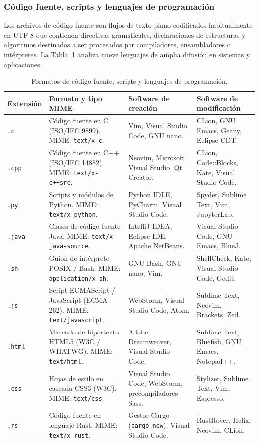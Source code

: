 \documentclass[12pt]{article}
\begin{document}
\subsubsection{Código fuente, scripts y lenguajes de programación}
Los archivos de código fuente son flujos de texto plano codificados habitualmente en UTF-8 que contienen directivas gramaticales, declaraciones de estructuras y algoritmos destinados a ser procesados por compiladores, ensambladores o intérpretes. La Tabla~\ref{tab:formatosCodigo} analiza nueve lenguajes de amplia difusión en sistemas y aplicaciones.

\begin{table}[H]
\centering
\scriptsize
\renewcommand{\arraystretch}{0.95}
\renewcommand{\tabularxcolumn}[1]{m{#1}}
\setlength{\emergencystretch}{2em}
\caption{Formatos de código fuente, scripts y lenguajes de programación.}
\label{tab:formatosCodigo}
\begin{tabularx}{\textwidth}{>{\centering\arraybackslash}m{1.8cm} X X X}
\toprule
\textbf{Extensión} & \textbf{Formato y tipo MIME} & \textbf{Software de creación} & \textbf{Software de modificación} \\
\midrule
\texttt{.c} & Código fuente en C (ISO/IEC 9899). MIME: \texttt{text/x-c}. & Vim, Visual Studio Code, GNU nano. & CLion, GNU Emacs, Geany, Eclipse CDT. \\
\texttt{.cpp} & Código fuente en C++ (ISO/IEC 14882). MIME: \texttt{text/x-c++src}. & Neovim, Microsoft Visual Studio, Qt Creator. & CLion, Code::Blocks, Kate, Visual Studio Code. \\
\texttt{.py} & Scripts y módulos de Python. MIME: \texttt{text/x-python}. & Python IDLE, PyCharm, Visual Studio Code. & Spyder, Sublime Text, Vim, JupyterLab. \\
\texttt{.java} & Clases de código fuente Java. MIME: \texttt{text/x-java-source}. & IntelliJ IDEA, Eclipse IDE, Apache NetBeans. & Visual Studio Code, GNU Emacs, BlueJ. \\
\texttt{.sh} & Guion de intérprete POSIX / Bash. MIME: \texttt{application/x-sh}. & GNU Bash, GNU nano, Vim. & ShellCheck, Kate, Visual Studio Code, Gedit. \\
\texttt{.js} & Script ECMAScript / JavaScript (ECMA-262). MIME: \texttt{text/javascript}. & WebStorm, Visual Studio Code, Atom. & Sublime Text, Neovim, Brackets, Zed. \\
\texttt{.html} & Marcado de hipertexto HTML5 (W3C / WHATWG). MIME: \texttt{text/html}. & Adobe Dreamweaver, Visual Studio Code. & Sublime Text, Bluefish, GNU Emacs, Notepad++. \\
\texttt{.css} & Hojas de estilo en cascada CSS3 (W3C). MIME: \texttt{text/css}. & Visual Studio Code, WebStorm, precompiladores Sass. & Stylizer, Sublime Text, Vim, Espresso. \\
\texttt{.rs} & Código fuente en lenguaje Rust. MIME: \texttt{text/x-rust}. & Gestor Cargo (\texttt{cargo new}), Visual Studio Code. & RustRover, Helix, Neovim, CLion. \\
\bottomrule
\end{tabularx}
\end{table}
\end{document}
